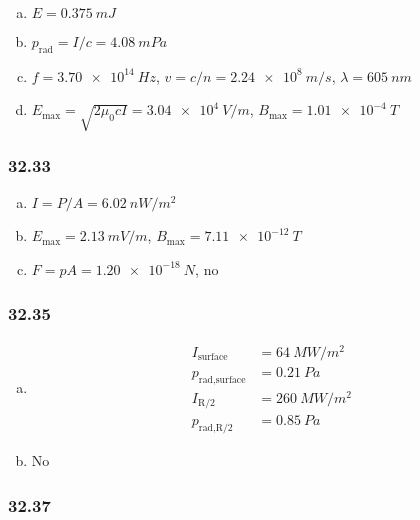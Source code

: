 \documentclass{article}
\begin{document}
\begin{enumerate}[(a)]
  \item $E = \qty{0.375}{mJ}$

  \item $p_\text{rad} = I / c = \qty{4.08}{mPa}$

  \item $f = \qty{3.70e14}{Hz}$, $v = c / n = \qty{2.24e8}{m/s}$, $\lambda = \qty{605}{nm}$

  \item $E_\text{max} = \sqrt{2 \mu_0 c I} = \qty{3.04e4}{V/m}$, $B_\text{max} = \qty{1.01e-4}{T}$
\end{enumerate}

\subsubsection{32.33}

\begin{enumerate}[(a)]
  \item $I = P / A = \qty{6.02}{nW/m^2}$

  \item $E_\text{max} = \qty{2.13}{mV/m}$, $B_\text{max} = \qty{7.11e-12}{T}$

  \item $F = p A = \qty{1.20e-18}{N}$, no
\end{enumerate}

\subsubsection{32.35}

\begin{enumerate}[(a)]
  \item

        \begin{align*}
          I_\text{surface}     & = \qty{64}{MW/m^2}  \\
          p_\text{rad,surface} & = \qty{0.21}{Pa}    \\
          I_\text{R/2}         & = \qty{260}{MW/m^2} \\
          p_\text{rad,R/2}     & = \qty{0.85}{Pa}
        \end{align*}

  \item No
\end{enumerate}

\subsubsection{32.37}
\end{document}
